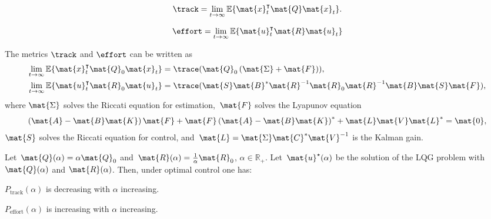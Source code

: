 {\begin{forslides}
        \begin{equation*}
            \label{eq:ptrack}
            \track=\lim_{t\to \infty}\mathbb{E}\{\mat{x}_t^\intercal \mat{Q}\mat{x}_t\}.
        \end{equation*}

        \begin{equation*}
            \label{eq:peffort}
            \effort=\lim_{t\to \infty}\mathbb{E}\{\mat{u}_t^\intercal \mat{R} \mat{u}_t \}
        \end{equation*}


        \begin{lemma}
            \label{lem:precision}
            The metrics $\track$ and $\effort$ can be written as
            \begin{equation*}
                \begin{aligned}
                    \lim_{t\to \infty}\mathbb{E}\{ \mat{x}_t^\intercal \mat{Q}_0\mat{x}_t\}&=\trace(\mat{Q}_0\left( \mat{\Sigma} +\mat{F}\right)), \\
                    \lim_{t\to \infty}\mathbb{E}\{ \mat{u}_t^\intercal \mat{R}_0\mat{u}_t\}&=\trace(\mat{S}\mat{B}^*\mat{R}^{-1}\mat{R}_0\mat{R}^{-1}\mat{B}\mat{S}\mat{F}),
                \end{aligned}
            \end{equation*}
            where
            $\mat{\Sigma}$ solves the Riccati equation for estimation,~$\mat{F}$ solves the Lyapunov equation
            \begin{equation}
                \label{eq:lyapct}
                \left( \mat{A}-\mat{B}\mat{K}\right)\mat{F}+\mat{F}\left(\mat{A}-\mat{B}\mat{K}\right)^*+\mat{L}\mat{V}\mat{L}^*=\mat{0},
            \end{equation}
            $\mat{S}$ solves the Riccati equation for control, and~$\mat{L}=\mat{\Sigma}\mat{C}^*\mat{V}^{-1}$ is the Kalman gain.
        \end{lemma}


        \begin{lemma}
            \label{lem:codesigncnt_1}
            Let~$\mat{Q}(\alpha)=\alpha \mat{Q}_0$ and~$\mat{R}(\alpha)=\frac{1}{\alpha}\mat{R}_0$, $\alpha\in \mathbb{R}_+$. Let~$\mat{u}^\star(\alpha)$ be the solution of the LQG problem with $\mat{Q}(\alpha)$ and $\mat{R}(\alpha)$. Then, under optimal control one has:
            \begin{compactitem}
                \item $P_\mathrm{track}(\alpha)$ is decreasing with $\alpha$
                increasing.
                \item $P_\mathrm{effort}(\alpha)$ is increasing with $\alpha$ increasing.
            \end{compactitem}
        \end{lemma}



\end{forslides}}
